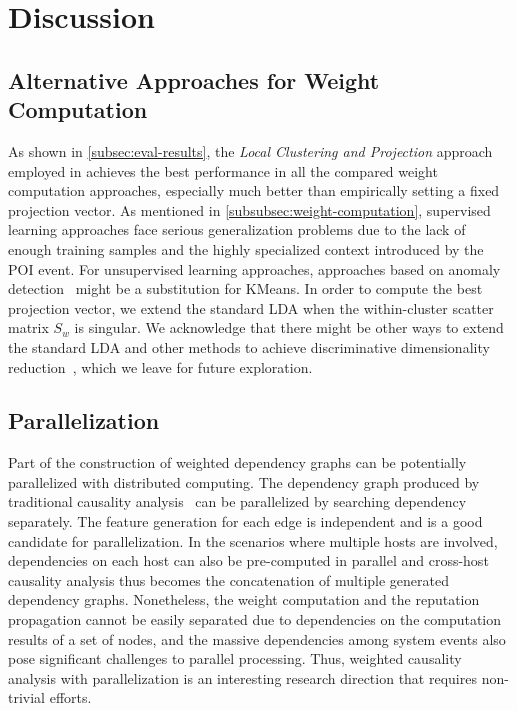 \section{Discussion}

\subsection{Alternative Approaches for Weight Computation}
As shown in \cref{subsec:eval-results}, the \emph{Local Clustering and Projection} approach employed in \tool achieves the best performance in all the compared weight computation approaches, especially much better than empirically setting a fixed projection vector. As mentioned in \cref{subsubsec:weight-computation}, supervised learning approaches face serious generalization problems due to the lack of enough training samples and the highly specialized context introduced by the POI event.
For unsupervised learning approaches, approaches based on anomaly detection~\cite{anomalysurvey} might be a substitution for KMeans.
In order to compute the best projection vector, we extend the standard LDA when the within-cluster scatter matrix $S_w$ is singular. We acknowledge that there might be other ways to extend the standard LDA and other methods to achieve discriminative dimensionality reduction~\cite{Mika99fisherdiscriminant,sugiyama2006local}, which we leave for future exploration.



\subsection{Parallelization}
Part of the construction of weighted dependency graphs can be potentially parallelized with distributed computing. 
The dependency graph produced by traditional causality analysis~\cite{backtracking,backtracking2} can be parallelized by
searching dependency separately.
The feature generation for each edge is independent and is a good candidate for parallelization.
In the scenarios where multiple hosts are involved, dependencies on each host can also be pre-computed in parallel and cross-host causality analysis thus becomes the concatenation of multiple generated dependency graphs. 
Nonetheless, the weight computation and the reputation propagation cannot be easily separated due to dependencies on the computation results of a set of nodes,
and the massive dependencies among system events also pose significant challenges to parallel processing.
Thus, weighted causality analysis with parallelization is an interesting research direction that requires non-trivial efforts.

